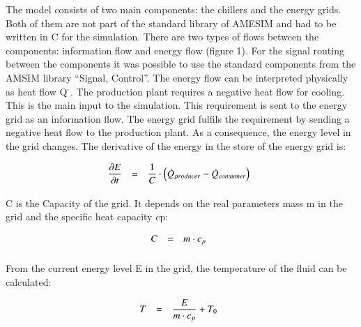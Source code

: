 \documentclass[3p,times,procedia,twocolumn,twoside]{elsarticle}
\begin{document}
The model consists of two main components: the chillers and the energy grids. Both of them are not part of the standard library of AMESIM and had to be written in C for the simulation. There are two types of flows between the components: information flow and energy flow (figure 1). For the signal routing between the components it was possible to use the standard components from the AMSIM library “Signal, Control”. The energy flow can be interpreted physically as heat flow Q ̇. The production plant requires a negative heat flow for cooling. This is the main input to the simulation. This requirement is sent to the energy grid as an information flow. The energy grid fulfils the requirement by sending a negative heat flow to the production plant. As a consequence, the energy level in the grid changes. The derivative of the energy in the store of the energy grid is:

\begin{equation}
\begin{array}{@{}lcl}

\displaystyle 
\frac{\partial E}{\partial t} &=& 
\displaystyle 
\frac
{1}
{C}
\cdot \left
(\dot{Q}_{producer} - \dot{Q}_{consumer}\right)
\\[6pt]

\end{array}\vspace*{-12pt}
\end{equation}

C is the Capacity of the grid. It depends on the real parameters mass m in the grid and the specific heat capacity cp:

\begin{equation}
\begin{array}{@{}lcl}

\displaystyle 
C &=& 
\displaystyle 
m \cdot c_p
\\[6pt]

\end{array}\vspace*{-12pt}
\end{equation}

From the current energy level E in the grid, the temperature of the fluid can be calculated:

\begin{equation}
\begin{array}{@{}lcl}

\displaystyle 
T &=& 
\displaystyle 
\frac{E}
{m \cdot c_p}
+ T_0
\\[6pt]

\end{array}\vspace*{-12pt}
\end{equation}
\end{document}
